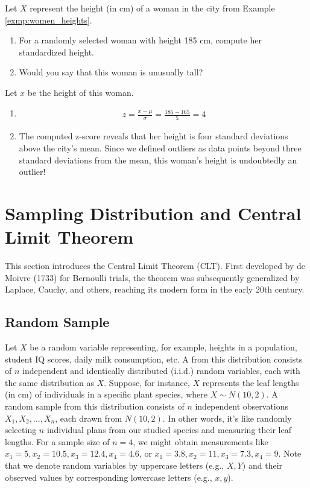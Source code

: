 \begin{exmp}
    Let \( X \) represent the height (in cm) of a woman in the city from Example \autoref{exmp:women_heights}.
    \begin{enumerate}
        \item For a randomly selected woman with height 185 cm, compute her standardized height.
        \item Would you say that this woman is unusually tall?
    \end{enumerate}
\end{exmp}
\begin{solution}
    Let \( x \) be the height of this woman.
    \begin{enumerate}
        \item \begin{gather*}
            z = \frac{x - \mu}{\sigma} = \frac{185 - 165}{5} = 4
        \end{gather*}
        \item The computed z-score reveals that her height is four standard deviations above the city's mean.
        Since we defined outliers as data points beyond three standard deviations from the mean,
        this woman's height is undoubtedly an outlier!
    \end{enumerate}
\end{solution}

\section{Sampling Distribution and Central Limit Theorem}

This section introduces the Central Limit Theorem (CLT).
First developed by de Moivre (1733) for Bernoulli trials,
the theorem was subsequently generalized by Laplace, Cauchy, and others,
reaching its modern form in the early 20th century.

\subsection{Random Sample}

Let \( X \) be a random variable representing, for example, heights in a population, student IQ scores, daily milk consumption, etc.
A  from this distribution consists of \( n \) independent and identically distributed (i.i.d.) random variables, each with the same distribution as \( X \).
Suppose, for instance, \( X \) represents the leaf lengths (in cm) of individuals in a specific plant species, where \( X \sim N(10, 2) \).
A random sample from this distribution consists of \( n \) independent observations \( X_1, X_2, \ldots, X_n \), each drawn from \( N(10, 2) \).
In other words, it's like randomly selecting \( n \) individual plans from our studied species and measuring their leaf lengths.
For a sample size of \( n = 4 \), we might obtain measurements like \( x_1 = 5, x_2 = 10.5, x_3 = 12.4, x_4 = 4.6 \),
or \( x_1 = 3.8, x_2 = 11, x_3 = 7.3, x_4 = 9 \).
Note that we denote random variables by uppercase letters (e.g., \( X, Y \)) and their observed values by corresponding lowercase letters (e.g., \( x, y \)).

